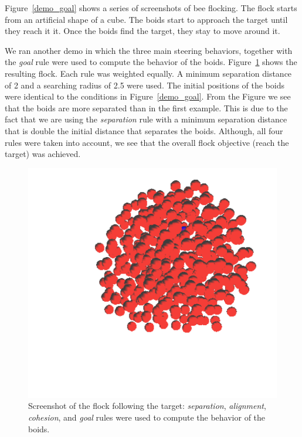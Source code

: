Figure~\ref{demo_goal} shows a series of screenshots of bee flocking. The flock starts from an artificial shape of a cube. The boids start to approach the target until they reach it it. Once the boids find the target, they stay to move around it. 

We ran another demo in which the three main steering behaviors, together with the \textit{goal} rule were used to compute the behavior of the boids. Figure~\ref{goal_4rules} shows the resulting flock. Each rule was weighted equally. A minimum separation distance of 2 and a searching radius of 2.5 were used. The initial positions of the boids were identical to the conditions in Figure~\ref{demo_goal}. From the Figure we see that the boids are more separated than in the first example. This is due to the fact that we are using the \textit{separation} rule with a minimum separation distance that is double the initial distance that separates the boids. Although, all four rules were taken into account, we see that the overall flock objective (reach the target) was achieved. 

\begin{figure}[htbp]
\begin{center}
\includegraphics[scale=0.35]{figures/demo_goal_4rules.pdf}
\caption{Screenshot of the flock following the target: \textit{separation}, \textit{alignment}, \textit{cohesion}, and \textit{goal} rules were used to compute the behavior of the boids.}
\label{goal_4rules}
\end{center}
\end{figure}

